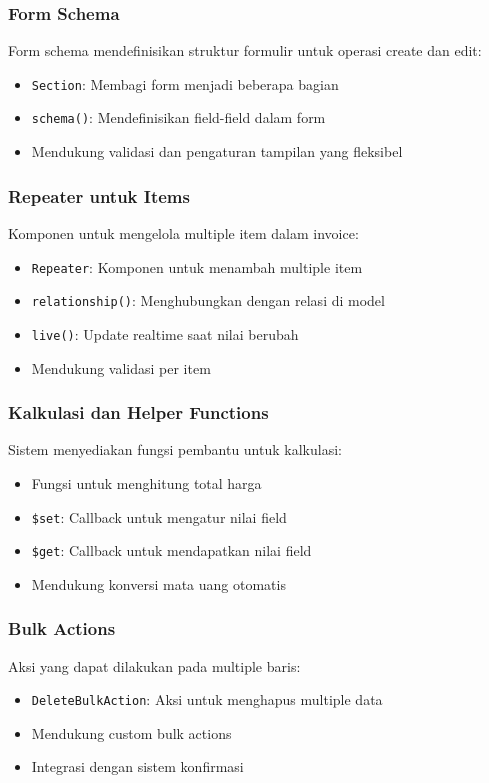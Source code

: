 \documentclass[a4paper]{report}
\begin{document}
\subsubsection{Form Schema}
Form schema mendefinisikan struktur formulir untuk operasi create dan edit:
\begin{itemize}
\item \texttt{Section}: Membagi form menjadi beberapa bagian
\item \texttt{schema()}: Mendefinisikan field-field dalam form
\item Mendukung validasi dan pengaturan tampilan yang fleksibel
\end{itemize}

\subsubsection{Repeater untuk Items}
Komponen untuk mengelola multiple item dalam invoice:
\begin{itemize}
\item \texttt{Repeater}: Komponen untuk menambah multiple item
\item \texttt{relationship()}: Menghubungkan dengan relasi di model
\item \texttt{live()}: Update realtime saat nilai berubah
\item Mendukung validasi per item
\end{itemize}

\subsubsection{Kalkulasi dan Helper Functions}
Sistem menyediakan fungsi pembantu untuk kalkulasi:
\begin{itemize}
\item Fungsi untuk menghitung total harga
\item \texttt{\$set}: Callback untuk mengatur nilai field
\item \texttt{\$get}: Callback untuk mendapatkan nilai field
\item Mendukung konversi mata uang otomatis
\end{itemize}

\subsubsection{Bulk Actions}
Aksi yang dapat dilakukan pada multiple baris:
\begin{itemize}
\item \texttt{DeleteBulkAction}: Aksi untuk menghapus multiple data
\item Mendukung custom bulk actions
\item Integrasi dengan sistem konfirmasi
\end{itemize}
\end{document}

